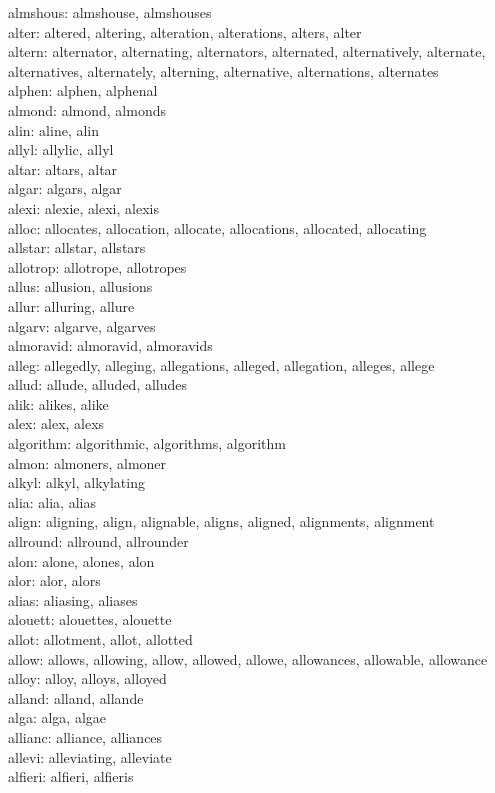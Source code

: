 \documentclass[10pt,letterpaper,bibliography=totoc]{scrartcl}
\begin{document}
almshous: almshouse, almshouses\\
alter: altered, altering, alteration, alterations, alters, alter\\
altern: alternator, alternating, alternators, alternated, alternatively, alternate, alternatives, alternately, alterning, alternative, alternations, alternates\\
alphen: alphen, alphenal\\
almond: almond, almonds\\
alin: aline, alin\\
allyl: allylic, allyl\\
altar: altars, altar\\
algar: algars, algar\\
alexi: alexie, alexi, alexis\\
alloc: allocates, allocation, allocate, allocations, allocated, allocating\\
allstar: allstar, allstars\\
allotrop: allotrope, allotropes\\
allus: allusion, allusions\\
allur: alluring, allure\\
algarv: algarve, algarves\\
almoravid: almoravid, almoravids\\
alleg: allegedly, alleging, allegations, alleged, allegation, alleges, allege\\
allud: allude, alluded, alludes\\
alik: alikes, alike\\
alex: alex, alexs\\
algorithm: algorithmic, algorithms, algorithm\\
almon: almoners, almoner\\
alkyl: alkyl, alkylating\\
alia: alia, alias\\
align: aligning, align, alignable, aligns, aligned, alignments, alignment\\
allround: allround, allrounder\\
alon: alone, alones, alon\\
alor: alor, alors\\
alias: aliasing, aliases\\
alouett: alouettes, alouette\\
allot: allotment, allot, allotted\\
allow: allows, allowing, allow, allowed, allowe, allowances, allowable, allowance\\
alloy: alloy, alloys, alloyed\\
alland: alland, allande\\
alga: alga, algae\\
allianc: alliance, alliances\\
allevi: alleviating, alleviate\\
alfieri: alfieri, alfieris\\
\end{document}

